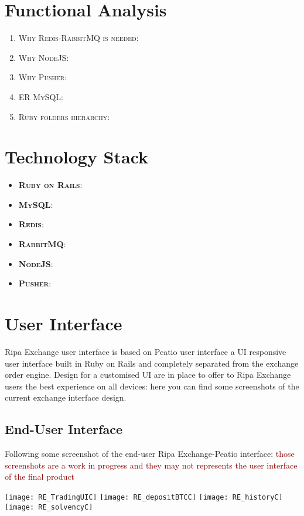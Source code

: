 \documentclass[11pt,fleqn]{book} %
\begin{document}
\section{Functional Analysis}
\begin{enumerate}
	\item \textsc{Why Redis-RabbitMQ is needed}:
	\item \textsc{Why NodeJS}: 
	\item \textsc{Why Pusher}:
	\item \textsc{ER MySQL}:
	\item \textsc{Ruby folders hierarchy}:
\end{enumerate}

\section{Technology Stack}
\begin{itemize}
	\item \textbf{\textsc{Ruby on Rails}}:
	\item \textbf{\textsc{MySQL}}: 
	\item \textbf{\textsc{Redis}}:
	\item \textbf{\textsc{RabbitMQ}}:
	\item \textbf{\textsc{NodeJS}}:
	\item \textbf{\textsc{Pusher}}:
\end{itemize}

\section{User Interface}
Ripa Exchange user interface is based on Peatio user interface a UI responsive user interface built in Ruby on Rails and 
completely separated from the exchange order engine.
Design for a customised UI are in place to offer to Ripa Exchange users the best experience on all devices: here you can find
some screenshots of the current exchange interface design.

\subsection{End-User Interface}
Following some screenshot of the end-user Ripa Exchange-Peatio interface: 
\textcolor{darkred}{those screenshots are a work in progress and they may not represents the user interface of the final product}
\begin{center}
	\texttt{[image: RE\_TradingUIC]}
	\texttt{[image: RE\_depositBTCC]}
	\texttt{[image: RE\_historyC]}
	\texttt{[image: RE\_solvencyC]}
\end{center}
\end{document}
